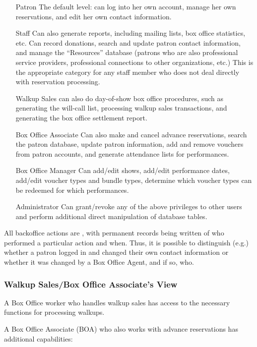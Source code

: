 \begin{enumerate}
\item[Patron] The default level: can log into her own account, manage
  her own reservations, and edit her own contact information.
\item[Staff] Can also generate reports, including mailing lists, box
  office statistics, etc.  Can record
  donations, search and update patron contact information, and manage
  the ``Resources'' database (patrons who are also professional service
  providers, professional connections to other organizations, etc.) This
  is the appropriate category for any 
  staff member who does not deal directly with reservation processing.
\item[Walkup Sales] can also do day-of-show box office procedures, such
  as generating the will-call list, processing walkup sales
  transactions, and generating the box office settlement report.
\item[Box Office Associate] Can also make and cancel advance
  reservations, search the patron database, update patron information,
  add and remove vouchers from patron accounts, and generate attendance lists for performances.
\item[Box Office Manager] Can add/edit shows, add/edit performance dates,
  add/edit voucher types and bundle types, determine which voucher types
  can be redeemed for which performances.
\item[Administrator] Can grant/revoke any of the above privileges to
  other users and perform additional direct manipulation of database tables.
\end{enumerate}

All backoffice actions are , with
permanent records being written of who performed a particular action and
when.  Thus, it is possible to distinguish (e.g.)  whether a patron
logged in and changed their own contact information or whether it was
changed by a Box Office Agent, and if so, who.

\subsubsection{Walkup Sales/Box Office Associate's View}

A Box Office worker who handles walkup sales has access to the necessary
functions for processing walkups.

A Box Office Associate (BOA) who also works with advance reservations
has additional capabilities:

